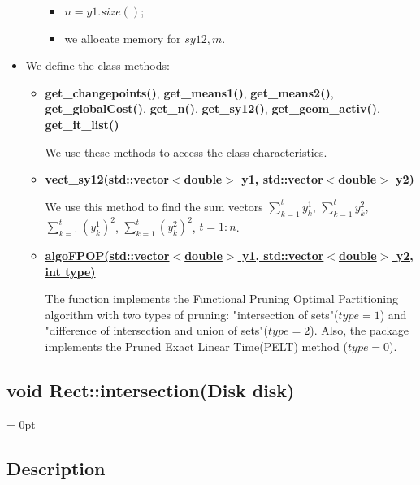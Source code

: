 \documentclass{report}
\begin{document}
\begin{itemize}
\begin{itemize}
\begin{itemize}
				\item $n = y1.size()$;
				
				\item we allocate memory for $sy12, m$.
			\end{itemize}	
		\end{itemize}
		
		\item We define the class methods:
		
		\begin{itemize}
			\item {\bfseries get\_changepoints()}, {\bfseries get\_means1()}, {\bfseries get\_means2()}, {\bfseries get\_globalCost()}, {\bfseries get\_n()}, {\bfseries get\_sy12()}, {\bfseries get\_geom\_activ()}, {\bfseries get\_it\_list()}  
			
			We use these  methods to access the class characteristics.
			
			\item {\bfseries vect\_sy12(std::vector$<$double$>$ y1, std::vector$<$double$>$ y2)}
			
			We use this method to find the sum vectors $\sum_{k=1}^{t} y^1_k$,  $\sum_{k=1}^{t}y^2_k
			$, $\sum_{k=1}^{t} (y^1_k)^2$,  $\sum_{k=1}^{t} (y^2_k)^2$, $t = 1:n$. 
			
			\item \hyperref [algoFPOP] {\bfseries algoFPOP(std::vector$<$double$>$ y1, std::vector$<$double$>$ y2, int type)} 
			
			The function implements the Functional Pruning Optimal Partitioning algorithm with two types of pruning: "intersection of sets"($type = 1$) and "difference of intersection and union of sets"($type = 2$). Also, the package implements the Pruned Exact Linear Time(PELT) method ($type = 0$).
		\end{itemize}
	\end{itemize}

\newpage

\label{Intersection}	
\begin{center} 
	\section*{void Rect::intersection(Disk disk)}
\end{center}

\parindent = 0pt
\subsection*{Description}
\end{document}
